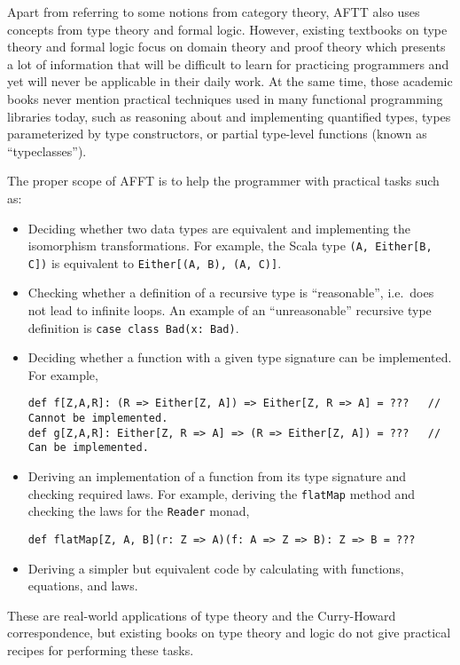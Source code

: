Apart from referring to some notions from category theory, AFTT also
uses concepts from type theory and formal logic. However, existing
textbooks on type theory and formal logic focus on domain theory and
proof theory \textemdash{} which presents a lot of information that
will be difficult to learn for practicing programmers and yet will
never be applicable in their daily work. At the same time, those academic
books never mention practical techniques used in many functional programming
libraries today, such as reasoning about and implementing quantified
types, types parameterized by type constructors, or partial type-level
functions (known as ``typeclasses'').

The proper scope of AFFT is to help the programmer with practical
tasks such as:
\begin{itemize}
\item Deciding whether two data types are equivalent and implementing the
isomorphism transformations. For example, the Scala type \lstinline!(A, Either[B, C])!
is equivalent to \lstinline!Either[(A, B), (A, C)]!.
\item Checking whether a definition of a recursive type is ``reasonable'',
i.e.~does not lead to infinite loops. An example of an ``unreasonable''
recursive type definition is \lstinline!case class Bad(x: Bad)!.
\item Deciding whether a function with a given type signature can be implemented.
For example, 
\begin{lstlisting}
def f[Z,A,R]: (R => Either[Z, A]) => Either[Z, R => A] = ???   // Cannot be implemented.
def g[Z,A,R]: Either[Z, R => A] => (R => Either[Z, A]) = ???   // Can be implemented.
\end{lstlisting}
\item Deriving an implementation of a function from its type signature and
checking required laws. For example, deriving the \lstinline!flatMap!
method and checking the laws for the \lstinline!Reader! monad,
\begin{lstlisting}
def flatMap[Z, A, B](r: Z => A)(f: A => Z => B): Z => B = ???
\end{lstlisting}
\item Deriving a simpler but equivalent code by calculating with functions,
equations, and laws.
\end{itemize}
These are real-world applications of type theory and the Curry-Howard
correspondence, but existing books on type theory and logic do not
give practical recipes for performing these tasks.

